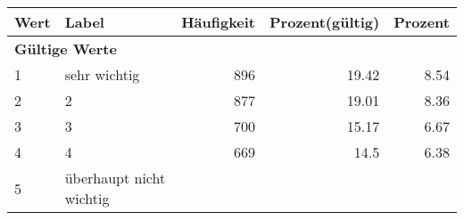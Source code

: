      \begin{longtable}{lXrrr}
     \toprule
     \textbf{Wert} & \textbf{Label} & \textbf{Häufigkeit} & \textbf{Prozent(gültig)} & \textbf{Prozent} \\
     \endhead
     \midrule
     \multicolumn{5}{l}{\textbf{Gültige Werte}}\\

     1 &
     \multicolumn{1}{X}{ sehr wichtig   } &


       \num{896} &
       \num[round-mode=places,round-precision=2]{19,42} &
         \num[round-mode=places,round-precision=2]{8,54} \\

     2 &
     \multicolumn{1}{X}{ 2   } &


       \num{877} &
       \num[round-mode=places,round-precision=2]{19,01} &
         \num[round-mode=places,round-precision=2]{8,36} \\

     3 &
     \multicolumn{1}{X}{ 3   } &


       \num{700} &
       \num[round-mode=places,round-precision=2]{15,17} &
         \num[round-mode=places,round-precision=2]{6,67} \\

     4 &
     \multicolumn{1}{X}{ 4   } &


       \num{669} &
       \num[round-mode=places,round-precision=2]{14,5} &
         \num[round-mode=places,round-precision=2]{6,38} \\

     5 &
     \multicolumn{1}{X}{ überhaupt nicht wichtig   } &



\end{longtable}
